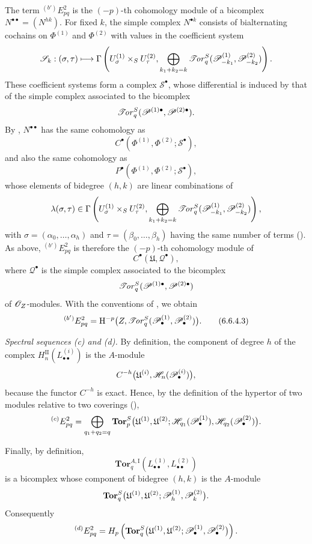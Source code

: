 \begin{env}[6.6.4]
The term ${}^{(b')}E_{pq}^2$ is the $(-p)$-th cohomology module
of a bicomplex $N^{\bullet\bullet}=(N^{hk})$.  For fixed $k$,
the simple complex $N^{\bullet k}$ consists of bialternating
cochains on $\Phi^{(1)}$ and $\Phi^{(2)}$ with values in the
coefficient system
\[
  \mathscr S_k:(\sigma,\tau)\longmapsto
  \Gamma\left(
    U_\sigma^{(1)}\times_SU_\tau^{(2)},
    \bigoplus_{k_1+k_2=k}
    \mathscr{T}\!\mathit{or}_q^S(\mathscr{P}_{-k_1}^{(1)},\mathscr{P}_{-k_2}^{(2)})
  \right).
\]
These coefficient systems form a complex
$\mathcal S^\bullet$, whose differential is induced by that of
the simple complex associated to the bicomplex
\[
  \mathscr{T}\!\mathit{or}_q^S
  (\mathscr{P}^{(1)\bullet},\mathscr{P}^{(2)\bullet}).
\]
By , $N^{\bullet\bullet}$ has the same
cohomology as
\[
  C^\bullet
  (\Phi^{(1)},\Phi^{(2)};\mathcal S^\bullet),
\]
and also the same cohomology as
\[
  P^\bullet
  (\Phi^{(1)},\Phi^{(2)};\mathcal S^\bullet),
\]
whose elements of bidegree $(h,k)$ are linear combinations of
\[
  \lambda(\sigma,\tau)\in
  \Gamma\left(
    U_\sigma^{(1)}\times_SU_\tau^{(2)},
    \bigoplus_{k_1+k_2=k}
    \mathscr{T}\!\mathit{or}_q^S(\mathscr{P}_{-k_1}^{(1)},\mathscr{P}_{-k_2}^{(2)})
  \right),
\]
with $\sigma=(\alpha_0,\ldots,\alpha_h)$ and
$\tau=(\beta_0,\ldots,\beta_h)$ having the same number of terms
().  As above, ${}^{(b')}E_{pq}^2$ is
therefore the $(-p)$-th cohomology module of
\[
  C^\bullet(\mathfrak U,\mathcal Q^\bullet),
\]
where $\mathcal Q^\bullet$ is the simple complex associated to
the bicomplex
\[
  \mathscr{T}\!\mathit{or}_q^S
  (\mathscr{P}^{(1)\bullet},\mathscr{P}^{(2)\bullet})
\]
of $\mathscr{O}_Z$-modules.  With the conventions of
, we obtain
\[
  {}^{(b')}E_{pq}^2
  =
  \mathrm{H}^{-p}
  \bigl(
    Z,\mathscr{T}\!\mathit{or}_q^S
    (\mathscr{P}_\bullet^{(1)},\mathscr{P}_\bullet^{(2)})
  \bigr).
  \tag{6.6.4.3}\label{III.6.6.4.3}
\]
\end{env}


\begin{env}[6.6.5]
\label{III.6.6.5}
\emph{Spectral sequences \textnormal{(c)} and
\textnormal{(d)}.}
By definition, the component of degree $h$ of the complex
$H_n^{\mathrm{II}}(L_{\bullet\bullet}^{(i)})$ is the
$A$-module
\[
  C^{-h}
  \bigl(
    \mathfrak U^{(i)},
    \mathscr{H}_n(\mathscr{P}_\bullet^{(i)})
  \bigr),
\]
because the functor $C^{-h}$ is exact.  Hence, by the definition
of the hypertor of two modules relative to two coverings
(),
\[
  {}^{(c)}E_{pq}^2
  =
  \bigoplus_{q_1+q_2=q}
  \mathbf{Tor}_p^S
  \bigl(
    \mathfrak U^{(1)},\mathfrak U^{(2)};
    \mathscr{H}_{q_1}(\mathscr{P}_\bullet^{(1)}),
    \mathscr{H}_{q_2}(\mathscr{P}_\bullet^{(2)})
  \bigr).
\]

Finally, by definition,
\[
  \mathbf{Tor}_q^{A,\mathrm I}
  (L_{\bullet\bullet}^{(1)},L_{\bullet\bullet}^{(2)})
\]
is a bicomplex whose component of bidegree $(h,k)$ is the
$A$-module
\[
  \mathbf{Tor}_q^S
  \bigl(
    \mathfrak U^{(1)},\mathfrak U^{(2)};
    \mathscr{P}_h^{(1)},\mathscr{P}_k^{(2)}
  \bigr).
\]
Consequently
\[
  {}^{(d)}E_{pq}^2
  =
  H_p\left(
    \mathbf{Tor}_q^S
    \bigl(
      \mathfrak U^{(1)},\mathfrak U^{(2)};
      \mathscr{P}_\bullet^{(1)},\mathscr{P}_\bullet^{(2)}
    \bigr)
  \right).
\]
\end{env}

